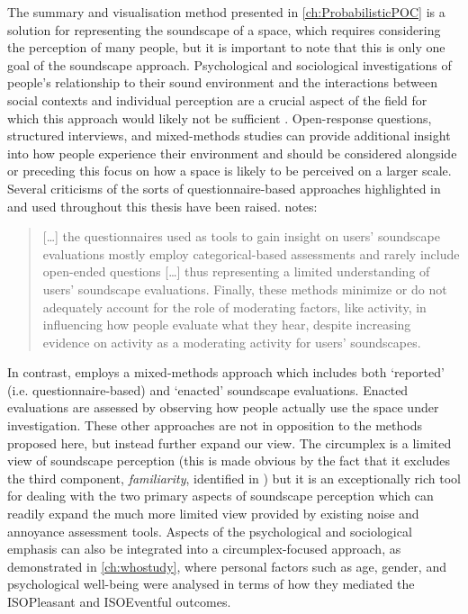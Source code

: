 The summary and visualisation method presented in \cref{ch:ProbabilisticPOC} is a solution for representing the soundscape of a space, which requires considering the perception of many people, but it is important to note that this is only one goal of the soundscape approach. Psychological and sociological investigations of people's relationship to their sound environment and the interactions between social contexts and individual perception are a crucial aspect of the field for which this approach would likely not be sufficient \citep{Bild2018Public}. Open-response questions, structured interviews, and mixed-methods studies can provide additional insight into how people experience their environment and should be considered alongside or preceding this focus on how a space is likely to be perceived on a larger scale. Several criticisms of the sorts of questionnaire-based approaches highlighted in \citet{ISO12913Part2} and used throughout this thesis have been raised. \citet{Bild2018Public} notes:

\begin{quote}
  [\dots] the questionnaires used as tools to gain insight on users’ soundscape evaluations mostly employ categorical-based assessments and rarely include open-ended questions [\ldots] thus representing a limited understanding of users’ soundscape evaluations. Finally, these methods minimize or do not adequately account for the role of moderating factors, like activity, in influencing how people evaluate what they hear, despite increasing evidence on activity as a moderating activity for users' soundscapes.
\end{quote}

In contrast, \citet{Bild2018Public} employs a mixed-methods approach which includes both `reported' (i.e. questionnaire-based) and `enacted' soundscape evaluations. Enacted evaluations are assessed by observing how people actually use the space under investigation. These other approaches are not in opposition to the methods proposed here, but instead further expand our view. The circumplex is a limited view of soundscape perception (this is made obvious by the fact that it excludes the third component, \emph{familiarity}, identified in \citet{Axelsson2010principal}) but it is an exceptionally rich tool for dealing with the two primary aspects of soundscape perception which can readily expand the much more limited view provided by existing noise and annoyance assessment tools. Aspects of the psychological and sociological emphasis can also be integrated into a circumplex-focused approach, as demonstrated in \cref{ch:whostudy}, where personal factors such as age, gender, and psychological well-being were analysed in terms of how they mediated the ISOPleasant and ISOEventful outcomes.

